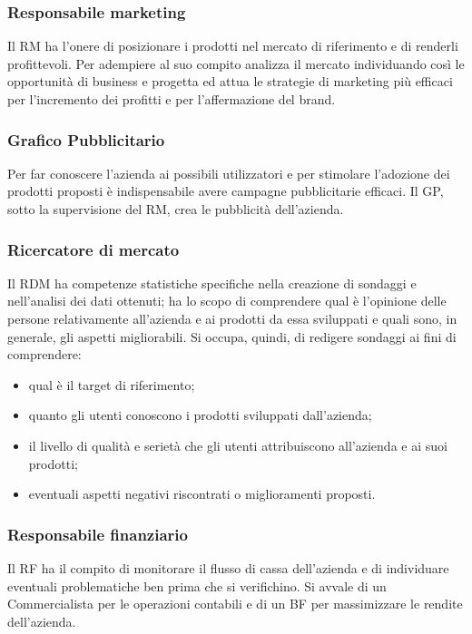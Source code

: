 \subsubsection{Responsabile marketing}
Il RM ha l\textquoteright{}onere di posizionare i prodotti nel mercato di riferimento e di renderli profittevoli.
Per adempiere al suo compito analizza il mercato individuando cos\`{i} le opportunit\`{a}
di business e progetta ed attua le strategie di marketing pi\`{u} efficaci per l\textquoteright{}incremento
dei profitti e per l\textquoteright{}affermazione del brand.

\subsubsection{Grafico Pubblicitario}
Per far conoscere l\textquoteright{}azienda ai possibili utilizzatori e per stimolare l\textquoteright{}adozione dei prodotti
proposti \`{e} indispensabile avere campagne pubblicitarie efficaci. Il GP, sotto la
supervisione del RM, crea le pubblicit\`{a} dell\textquoteright{}azienda.

\subsubsection{Ricercatore di mercato}
Il RDM ha competenze statistiche specifiche nella creazione di sondaggi e nell\textquoteright{}analisi
dei dati ottenuti; ha lo scopo di comprendere qual \`{e} l\textquoteright{}opinione delle persone relativamente
all\textquoteright{}azienda e ai prodotti da essa sviluppati e quali sono, in generale, gli aspetti
migliorabili. Si occupa, quindi, di redigere sondaggi ai fini di comprendere:
\begin{itemize}
\item qual \`{e} il target di riferimento;
\item quanto gli utenti conoscono i prodotti sviluppati dall\textquoteright{}azienda;
\item il livello di qualit\`{a} e seriet\`{a} che gli utenti attribuiscono all\textquoteright{}azienda e ai suoi
prodotti;
\item eventuali aspetti negativi riscontrati o miglioramenti proposti.
\end{itemize}

\subsubsection{Responsabile finanziario}
Il RF ha il compito di monitorare il flusso di cassa dell\textquoteright{}azienda e di individuare eventuali
problematiche ben prima che si verifichino. Si avvale di un Commercialista per le
operazioni contabili e di un BF per massimizzare le rendite dell\textquoteright{}azienda.

